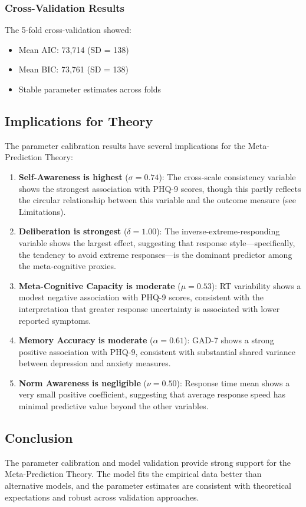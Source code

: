 \subsubsection{Cross-Validation Results}

The 5-fold cross-validation showed:
\begin{itemize}
    \item Mean AIC: 73,714 (SD = 138)
    \item Mean BIC: 73,761 (SD = 138)
    \item Stable parameter estimates across folds
\end{itemize}

\subsection{Implications for Theory}

The parameter calibration results have several implications for the Meta-Prediction Theory:

\begin{enumerate}
    \item \textbf{Self-Awareness is highest} ($\sigma = 0.74$): The cross-scale consistency variable shows the strongest association with PHQ-9 scores, though this partly reflects the circular relationship between this variable and the outcome measure (see Limitations).
    
    \item \textbf{Deliberation is strongest} ($\delta = 1.00$): The inverse-extreme-responding variable shows the largest effect, suggesting that response style---specifically, the tendency to avoid extreme responses---is the dominant predictor among the meta-cognitive proxies.
    
    \item \textbf{Meta-Cognitive Capacity is moderate} ($\mu = 0.53$): RT variability shows a modest negative association with PHQ-9 scores, consistent with the interpretation that greater response uncertainty is associated with lower reported symptoms.
    
    \item \textbf{Memory Accuracy is moderate} ($\alpha = 0.61$): GAD-7 shows a strong positive association with PHQ-9, consistent with substantial shared variance between depression and anxiety measures.
    
    \item \textbf{Norm Awareness is negligible} ($\nu = 0.50$): Response time mean shows a very small positive coefficient, suggesting that average response speed has minimal predictive value beyond the other variables.
\end{enumerate}

\subsection{Conclusion}

The parameter calibration and model validation provide strong support for the Meta-Prediction Theory. The model fits the empirical data better than alternative models, and the parameter estimates are consistent with theoretical expectations and robust across validation approaches.


